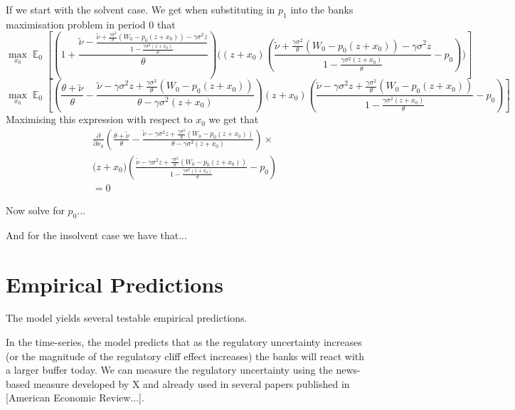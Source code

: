 \documentclass[11pt]{article}
\DeclareMathOperator{\E}{\mathbb{E}} %
\begin{document}
If we start with the solvent case. We get when substituting in $p_1$ into the banks maximisation problem in period 0 that
\begin{equation}
\max_{x_0} \E_0\left[\left(1 + \frac{\tilde{\nu} -\frac{\tilde{\nu} + \frac{\gamma \sigma^2}{\theta}(W_0 - p_0(z+x_0)) - \gamma \sigma^2z}{1 - \frac{\gamma\sigma^2(z+x_0)}{\theta}}}{\theta}\right)\bigg(\left(z+x_0\right)\left(\frac{\tilde{\nu} + \frac{\gamma \sigma^2}{\theta}(W_0 - p_0(z+x_0)) - \gamma \sigma^2z}{1 - \frac{\gamma\sigma^2(z+x_0)}{\theta}} - p_0\right) \bigg)  \right]
\end{equation}
\begin{equation}
\max_{x_0} \E_0\left[\left(\frac{\theta + \tilde{\nu}}{\theta} - \frac{\tilde{\nu} - \gamma \sigma^2z + \frac{\gamma \sigma^2}{\theta}(W_0 - p_0(z+x_0)) }{\theta - \gamma\sigma^2(z+x_0)}\right)\left(z+x_0\right)\left(\frac{\tilde{\nu} - \gamma \sigma^2z + \frac{\gamma \sigma^2}{\theta}(W_0 - p_0(z+x_0)) }{1 - \frac{\gamma\sigma^2(z+x_0)}{\theta}} - p_0\right)  \right]
\end{equation}
Maximising this expression with respect to $x_0$ we get that 
\begin{equation}
\begin{split}
\frac{\partial}{\partial x_0}\left(\frac{\theta + \tilde{\nu}}{\theta} - \frac{\tilde{\nu}  - \gamma \sigma^2z + \frac{\gamma \sigma^2}{\theta}(W_0 - p_0(z+x_0))}{\theta - \gamma\sigma^2(z+x_0)}\right)\times \\
\bigg(z+x_0\bigg)  \left(\frac{\tilde{\nu}  - \gamma \sigma^2z + \frac{\gamma \sigma^2}{\theta}(W_0 - p_0(z+x_0))}{1 - \frac{\gamma\sigma^2(z+x_0)}{\theta}} - p_0\right) \\
=0
\end{split}
\end{equation}

Now solve for $p_0$...

And for the insolvent case we have that...

\section{Empirical Predictions}
The model yields several testable empirical predictions.

In the time-series, the model predicts that as the regulatory uncertainty increases (or the magnitude of the regulatory cliff effect increases) the banks will react with a larger buffer today.
We can measure the regulatory uncertainty using the news-based measure developed by X and already used in several papers published in [American Economic Review...].
\end{document}
